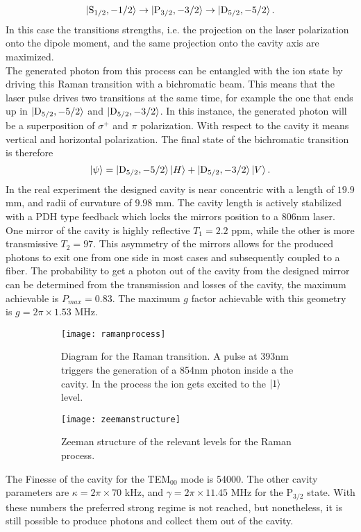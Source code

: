\begin{equation}
\ket{\text{S}_{1/2},-1/2}\to\ket{\text{P}_{3/2},-3/2} \to \ket{\text{D}_{5/2},-5/2}.
\end{equation}
In this case the transitions strengths, i.e. the projection on the laser polarization onto the dipole moment, and the same projection onto the cavity axis are maximized.\\
The generated photon from this process can be entangled with the ion state by driving this Raman transition with a bichromatic beam. This means that the laser pulse drives two transitions at the same time, for example the one that ends up in $\ket{\text{D}_{5/2},-5/2}$ and $\ket{\text{D}_{5/2},-3/2}$. In this instance, the generated photon will be a superposition of $\sigma^+$ and $\pi$ polarization. With respect to the cavity it means vertical and horizontal polarization. The final state of the bichromatic transition is therefore
\begin{equation}
\ket{\psi} = \ket{\text{D}_{5/2},-5/2}\ket{H} + \ket{\text{D}_{5/2},-3/2}\ket{V}.
\end{equation}
In the real experiment the designed cavity is near concentric with a length of $19.9$ mm, and radii of curvature of $9.98$ mm. The cavity length is actively stabilized with a PDH type feedback which locks the mirrors position to a 806nm laser. One mirror of the cavity is highly reflective $T_1 = 2.2$ ppm, while the other is more transmissive $T_2 = 97$. This asymmetry of the mirrors allows for the produced photons to exit one from one side in most cases and subsequently coupled to a fiber. The probability to get a photon out of the cavity from the designed mirror can be determined from the transmission and losses of the cavity, the maximum achievable is $P_{max} = 0.83$. The maximum $g$ factor achievable with this geometry is $g = 2\pi \times 1.53$ MHz.
\begin{figure}[H]
     \centering
     \begin{subfigure}[b]{0.49\textwidth}
         \centering
         \texttt{[image: ramanprocess]}
         \caption{Diagram for the Raman transition. A pulse at 393nm triggers the generation of a 854nm photon inside a the cavity. In the process the ion gets excited to the $\ket{1}$ level.}
     \end{subfigure}
     \hfill
     \begin{subfigure}[b]{0.49\textwidth}
         \centering
         \texttt{[image: zeemanstructure]}
         \caption{Zeeman structure of the relevant levels for the Raman process.}
         \vspace{1em}
     \end{subfigure}
        \caption{}
      \label{ramanprocess}
\end{figure}
 The Finesse of the cavity for the TEM$_{00}$ mode is 54000. The other cavity parameters are $\kappa = 2\pi \times 70$ kHz, and $\gamma = 2\pi\times 11.45$ MHz for the $\text{P}_{3/2}$ state. With these numbers the preferred strong regime is not reached, but nonetheless,  it is still possible to produce photons and collect them out of the cavity.
